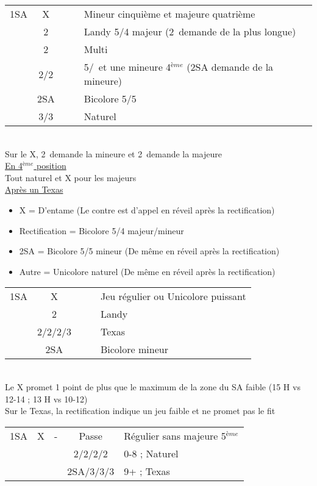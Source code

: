\documentclass[a4paper, oneside, 11pt]{report}
\begin{document}
	\begin{tabular}{cccc|l}
	1SA & X &&& Mineur cinquième et majeure quatrième\\
	& 2\trefle &&& Landy 5/4 majeur (2\carreau\ demande de la plus longue)\\
	& 2\carreau &&& Multi\\
	& 2\coeur/2\pique &&& 5\coeur/\pique\ et une mineure 4$^{ème}$ (2SA demande de la mineure)\\
	& 2SA &&& Bicolore 5\trefle/5\carreau\\
	& 3\trefle/3\carreau &&& Naturel\\
	\end{tabular}\\
	Sur le X, 2\trefle\ demande la mineure et 2\carreau\ demande la majeure\\
	
	\underline{En 4$^{ème}$ position}\\
	Tout naturel et X pour les majeurs\\

	\underline{Après un Texas}
	
	\begin{itemize}
	\item X = D'entame (Le contre est d'appel en réveil après la rectification)
	\item Rectification = Bicolore 5/4 majeur/mineur
	\item 2SA = Bicolore 5/5 mineur (De même en réveil après la rectification)
	\item Autre = Unicolore naturel (De même en réveil après la rectification)\\
	\end{itemize}

	\begin{tabular}{cccc|l}
	1SA & X &&& Jeu régulier ou Unicolore puissant\\
	& 2\trefle &&& Landy\\
	& 2\carreau/2\coeur/2\pique/3\trefle &&& Texas\\
	& 2SA &&& Bicolore mineur\\
	\end{tabular}\\
	Le X promet 1 point de plus que le maximum de la zone du SA faible (15 H vs 12-14 ; 13 H vs 10-12)\\
	Sur le Texas, la rectification indique un jeu faible et ne promet pas le fit\\

	\begin{tabular}{cccc|l}
	1SA & X & - & Passe & Régulier sans majeure 5$^{ème}$\\
	&&& 2\trefle/2\carreau/2\coeur/2\pique & 0-8 ; Naturel\\
	&&& 2SA/3\trefle/3\carreau/3\coeur & 9+ ; Texas\\
	\end{tabular}\\\\
\end{document}
